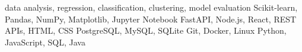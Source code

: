 %
%


\begin{cvlist}
    {data analysis, regression, classification, clustering, model evaluation}
    {Scikit-learn, Pandas, NumPy, Matplotlib, Jupyter Notebook}
    {FastAPI, Node.js, React, REST APIs, HTML, CSS}
    {PostgreSQL, MySQL, SQLite}
    {Git, Docker, Linux}
    {Python, JavaScript, SQL, Java}
\end{cvlist}
